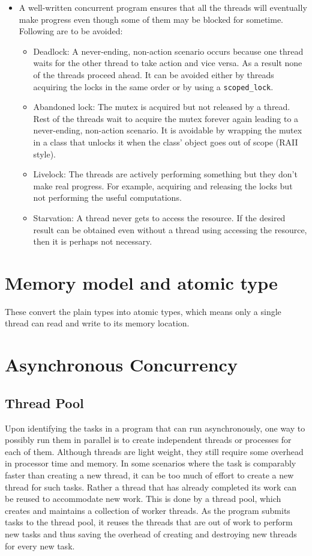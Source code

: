 \documentclass{scrartcl}
\begin{document}
\begin{itemize}
\item A well-written concurrent program ensures that all the threads will eventually make progress even though some of them may be blocked for sometime. Following are to be avoided:
\begin{itemize}
    \item Deadlock: A never-ending, non-action scenario occurs because one thread waits for the other thread to take action and vice versa. As a result none of the threads proceed ahead. It can be avoided either by threads acquiring the locks in the same order or by using a \texttt{scoped_lock}.
     \item Abandoned lock: The mutex is acquired but not released by a thread. Rest of the threads wait to acquire the mutex forever again leading to a never-ending, non-action scenario. It is avoidable by wrapping the mutex in a class that unlocks it when the class' object goes out of scope (RAII style).
     \item Livelock: The threads are actively performing something but they don’t make real progress. For example, acquiring and releasing the locks but not performing the useful computations.
     \item Starvation: A thread never gets to access the resource. If the desired result can be obtained even without a thread using accessing the resource, then it is perhaps not necessary.
\end{itemize}
\end{itemize}

\section{Memory model and atomic type}
These convert the plain types into atomic types, which means only a single thread can read and write to its memory location. 

\section{Asynchronous Concurrency}

\subsection{Thread Pool}
Upon identifying the tasks in a program that can run asynchronously, one way to possibly run them in parallel is to create independent threads or processes for each of them. Although threads are light weight, they still require some overhead in processor time and memory. In some scenarios where the task is comparably faster than creating a new thread, it can be too much of effort to create a new thread for such tasks. Rather a thread that has already completed its work can be reused to accommodate new work. This is done by a thread pool, which creates and maintains a collection of worker threads. As the program submits tasks to the thread pool, it reuses the threads that are out of work to perform new tasks and thus saving the overhead of creating and destroying new threads for every new task.
\end{document}
